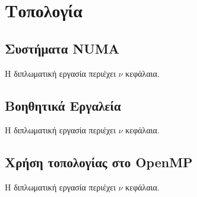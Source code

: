 \chapter{Τοπολογία}
\label{ch:Topology}


\section{Συστήματα NUMA}
\label{sec:NUMA Systems}
Η διπλωματική εργασία περιέχει $\nu$ κεφάλαια.

\section{Βοηθητικά Εργαλεία}
\label{sec:Utility Tools}
Η διπλωματική εργασία περιέχει $\nu$ κεφάλαια.

\section{Χρήση τοπολογίας στο OpenMP}
\label{sec:Topology usage in OpenMP}
Η διπλωματική εργασία περιέχει $\nu$ κεφάλαια.
